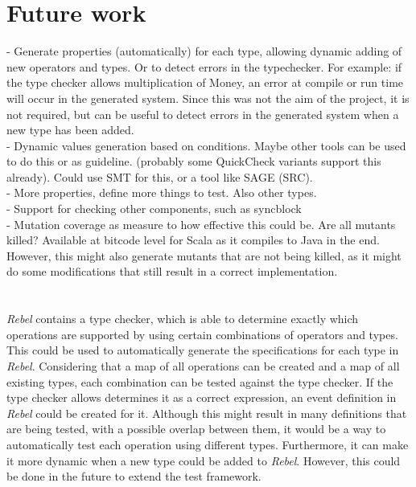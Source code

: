 \section{Future work}
- Generate properties (automatically) for each type, allowing dynamic adding of new operators and types. Or to detect errors in the typechecker. For example: if the type checker allows multiplication of Money, an error at compile or run time will occur in the generated system. Since this was not the aim of the project, it is not required, but can be useful to detect errors in the generated system when a new type has been added.  \\
- Dynamic values generation based on conditions. Maybe other tools can be used to do this or as guideline. (probably some QuickCheck variants support this already). Could use SMT for this, or a tool like SAGE (SRC).\\
- More properties, define more things to test. Also other types.\\ %
- Support for checking other components, such as syncblock\\
- Mutation coverage as measure to how effective this could be. Are all mutants killed? Available at bitcode level for Scala as it compiles to Java in the end. However, this might also generate mutants that are not being killed, as it might do some modifications that still result in a correct implementation.\\
\\
\\
\textit{Rebel} contains a type checker, which is able to determine exactly which operations are supported by using certain combinations of operators and types. This could be used to automatically generate the specifications for each type in \textit{Rebel}. Considering that a map of all operations can be created and a map of all existing types, each combination can be tested against the type checker. If the type checker allows determines it as a correct expression, an event definition in \textit{Rebel} could be created for it. Although this might result in many definitions that are being tested, with a possible overlap between them, it would be a way to automatically test each operation using different types. Furthermore, it can make it more dynamic when a new type could be added to \textit{Rebel}. However, this could be done in the future to extend the test framework.\\
